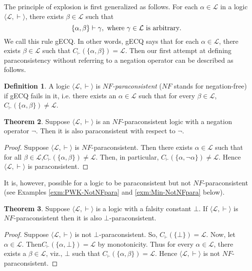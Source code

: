 \documentclass[submission]{eptcs}
\newcommand{\lang}{\mathcal{L}}
\theoremstyle{definition}
\newtheorem{thm}{Theorem}[section]
\newtheorem{dfn}[thm]{Definition}
\begin{document}
The principle of explosion is first generalized as follows. For each $\alpha\in\lang$ in a logic $\langle\lang,\vdash\rangle$, there exists $\beta\in\lang$ such that 
\[
\{\alpha,\beta\}\vdash\gamma, \hbox{ where }\gamma\in\lang \hbox{ is arbitrary}.
\]
We call this rule gECQ. In other words, gECQ says that for each $\alpha\in\lang$, there exists $\beta\in\lang$ such that $C_\vdash(\{\alpha,\beta\})=\lang$. Then our first attempt at defining paraconsistency without referring to a negation operator can be described as follows.

\begin{dfn}
A logic $\langle\lang,\vdash\rangle$ is \emph{$NF$-paraconsistent} ($NF$ stands for negation-free) if gECQ fails in it, i.e. there exists an $\alpha\in\lang$ such that for every $\beta\in\lang$, $C_\vdash(\{\alpha,\beta\})\neq\lang$.
\end{dfn}

\begin{thm}\label{thm:NFpara->para}
Suppose $\langle\lang,\vdash\rangle$ is an $NF$-paraconsistent logic with a negation operator $\neg$. Then it is also paraconsistent with respect to $\neg$.
\end{thm}

\begin{proof}
Suppose $\langle\lang,\vdash\rangle$ is $NF$-paraconsistent. Then there exists $\alpha\in\lang$ such that for all $\beta\in\lang$,\linebreak $C_\vdash(\{\alpha,\beta\})\neq\lang$. Then, in particular, $C_\vdash(\{\alpha,\neg\alpha\})\neq\lang$. Hence $\langle\lang,\vdash\rangle$ is paraconsistent.
\end{proof}

It is, however, possible for a logic to be paraconsistent but not $NF$-paraconsistent (see Examples \ref{exm:PWK-NotNFpara} and \ref{exm:Min-NotNFpara} below). 

\begin{thm}\label{thm:NFpara->Fpara}
Suppose $\langle\lang,\vdash\rangle$ is a logic with a falsity constant $\bot$. If $\langle\lang,\vdash\rangle$ is $NF$-paraconsistent then it is also $\bot$-paraconsistent.
\end{thm}

\begin{proof}
Suppose $\langle\lang,\vdash\rangle$ is not $\bot$-paraconsistent. So, $C_\vdash(\{\bot\})=\lang$. Now, let $\alpha\in\lang$. Then\linebreak $C_\vdash(\{\alpha,\bot\})=\lang$ by monotonicity. Thus for every $\alpha\in\lang$, there exists a $\beta\in\lang$, viz., $\bot$ such that $C_\vdash(\{\alpha,\beta\})=\lang$. Hence $\langle\lang,\vdash\rangle$ is not $NF$-paraconsistent.
\end{proof}
\end{document}

